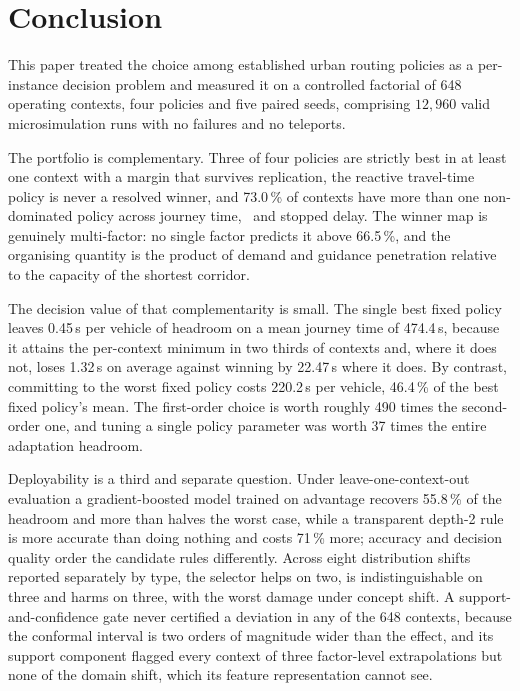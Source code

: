 
\section{Conclusion}
\label{sec:conclusion}

This paper treated the choice among established urban routing policies as a
per-instance decision problem and measured it on a controlled factorial of 648
operating contexts, four policies and five paired seeds, comprising $12{,}960$
valid microsimulation runs with no failures and no teleports.

The portfolio is complementary. Three of four policies are strictly best in at
least one context with a margin that survives replication, the reactive
travel-time policy is never a resolved winner, and 73.0\,\% of contexts have more
than one non-dominated policy across journey time, \CO\ and stopped delay. The
winner map is genuinely multi-factor: no single factor predicts it above
66.5\,\%, and the organising quantity is the product of demand and guidance
penetration relative to the capacity of the shortest corridor.

The decision value of that complementarity is small. The single best fixed policy
leaves 0.45\,s per vehicle of headroom on a mean journey time of 474.4\,s, because
it attains the per-context minimum in two thirds of contexts and, where it does
not, loses 1.32\,s on average against winning by 22.47\,s where it does. By
contrast, committing to the worst fixed policy costs 220.2\,s per vehicle, 46.4\,\%
of the best fixed policy's mean. The first-order choice is worth roughly 490 times
the second-order one, and tuning a single policy parameter was worth 37 times the
entire adaptation headroom.

Deployability is a third and separate question. Under leave-one-context-out
evaluation a gradient-boosted model trained on advantage recovers 55.8\,\% of the
headroom and more than halves the worst case, while a transparent depth-2 rule is
more accurate than doing nothing and costs 71\,\% more; accuracy and decision
quality order the candidate rules differently. Across eight distribution shifts
reported separately by type, the selector helps on two, is indistinguishable on
three and harms on three, with the worst damage under concept shift. A
support-and-confidence gate never certified a deviation in any of the 648
contexts, because the conformal interval is two orders of magnitude wider than the
effect, and its support component flagged every context of three factor-level
extrapolations but none of the domain shift, which its feature representation
cannot see.

